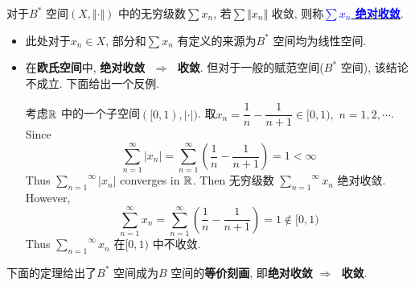 	\vspace{1em}
	
	\begin{defn}\label{def 2.1.3}
		对于$B^*$ 空间$(X , \Vert \cdot \Vert)$ 中的无穷级数$\sum x_n$, 若$\sum \Vert x_n \Vert$ 收敛, 则称\underline{\textcolor{blue}{\textbf{$\sum x_n$ 绝对收敛}}}. 
		
		\vspace{2em}
		
		\begin{rmk}
			\begin{itemize}
				\item 此处对于$x_n \in X$, 部分和$\sum x_n$ 有定义的来源为$B^*$ 空间均为线性空间. 
				
				\vspace{2em}
				
				\item 在\textbf{欧氏空间}中, \textbf{绝对收敛} $\,\, \Rightarrow \,\,$ \textbf{收敛}. 但对于一般的赋范空间($B^*$ 空间), 该结论不成立. 下面给出一个反例. 
				
				\vspace{4em}
				
				\begin{example}\label{ex 2.1.3}
					考虑$\mathbb{R}$ 中的一个子空间$([0 , 1) , | \cdot |)$. 取$x_n = \dfrac{1}{n} - \dfrac{1}{n + 1} \in [0 , 1) , \,\, n = 1 , 2 , \cdots$. \\
					Since
					\[ \sum_{n = 1}^{\infty} \left| x_n \right| = \sum_{n = 1}^{\infty} \left( \frac{1}{n} - \frac{1}{n + 1} \right) = 1 < \infty \]
					Thus $\overset{\infty}{\underset{n = 1}{\sum}} \left| x_n \right|$ converges in $\mathbb{R}$. Then 无穷级数 $\overset{\infty}{\underset{n = 1}{\sum}} x_n$ 绝对收敛. However, 
					\[ \sum_{n = 1}^{\infty} x_n = \sum_{n = 1}^{\infty} \left( \frac{1}{n} - \frac{1}{n + 1} \right) = 1 \not\in [0 , 1) \]
					Thus $\overset{\infty}{\underset{n = 1}{\sum}} x_n$ 在$[0 , 1)$ 中不收敛.
				\end{example}
			\end{itemize}
		\end{rmk}
	\end{defn}
	
	\newpage
	
	下面的定理给出了$B^*$ 空间成为$B$ 空间的\textbf{等价刻画}, 即\textbf{绝对收敛}$\,\, \Rightarrow \,\,$ \textbf{收敛}. 
	
